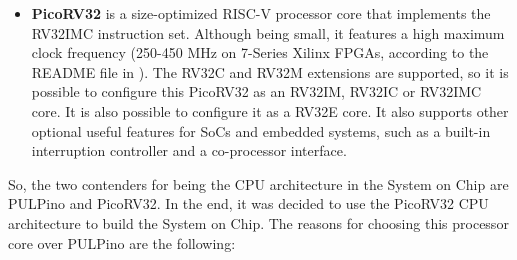 \begin{itemize}
	The zero-riscy architecture is derived from RI5CY CPU core. It features
        2 pipeline stages and, like the RI5CY core, supports the RV32I base
        instruction set and the RV32C and RV32M extensions. It is also possible
        to reduce the number of registers to 16, configuring the zero-riscy core
        to adopt the RV32E RISC-V instruction set, which is useful for embedded
        systems. This architecture also implements a subset of the privileged
        specification of the 1.9 version of the RISC-V ISA, just like RI5CY.
	
	PULPino provides a set of peripherals such as I2S, I2C, SPI and UART for
        communication with external systems. PULPino, RI5CY and zero-riscy are
        were all written with the SystemVerilog HDL\footnote{SystemVerilog is
          also a Hardware Verification Language (HVL).} (Hardware Description
        Language).
	
	\item \textbf{PicoRV32} \cite{bib:picorv32} is a size-optimized RISC-V
          processor core that implements the RV32IMC instruction set. Although
          being small, it features a high maximum clock frequency (250-450 MHz
          on 7-Series Xilinx FPGAs, according to the README file in
          \cite{bib:picorv32}). The RV32C and RV32M extensions are supported, so
          it is possible to configure this PicoRV32 as an RV32IM, RV32IC or
          RV32IMC core. It is also possible to configure it as a RV32E core. It
          also supports other optional useful features for SoCs and embedded
          systems, such as a built-in interruption controller and a co-processor
          interface.
		
\end{itemize}

So, the two contenders for being the CPU architecture in the \socname System on
Chip are PULPino and PicoRV32. In the end, it was decided to use the PicoRV32
CPU architecture to build the \socname System on Chip. The reasons for choosing
this processor core over PULPino are the following:

